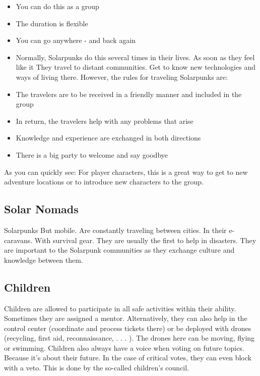 \begin{itemize}
    \item You can do this as a group
    \item The duration is flexible
    \item You can go anywhere - and back again
    \item Normally, Solarpunks do this several times in their lives. As soon as they feel like it They travel to distant communities. Get to know new technologies and ways of living there. However, the rules for traveling Solarpunks are:
    \item The travelers are to be received in a friendly manner and included in the group
    \item In return, the travelers help with any problems that arise
    \item Knowledge and experience are exchanged in both directions
    \item There is a big party to welcome and say goodbye
\end{itemize}

As you can quickly see: For player characters, this is a great way to get to new adventure locations or to introduce new characters to the group.

\subsection{Solar Nomads}
Solarpunks But mobile. Are constantly traveling between cities. In their e-caravans. With survival gear. They are usually the first to help in disasters. They are important to the Solarpunk communities as they exchange culture and knowledge between them.


\subsection{Children}
Children are allowed to participate in all safe activities within their ability. Sometimes they are assigned a mentor. Alternatively, they can also help in the control center (coordinate and process tickets there) or be deployed with drones (recycling, first aid, reconnaissance, . . . ). The drones here can be moving, flying or swimming.
Children also always have a voice when voting on future topics. Because it's about their future.
In the case of critical votes, they can even block with a veto. This is done by the so-called children's council.

